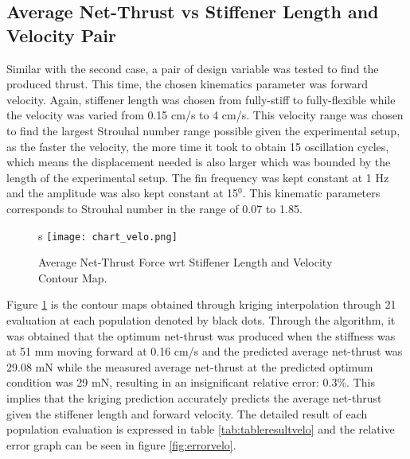 \subsection{Average Net-Thrust vs Stiffener Length and Velocity Pair}
Similar with the second case, a pair of design variable was tested to find the produced thrust. This time, the chosen kinematics parameter was forward velocity. Again, stiffener length was chosen from fully-stiff to fully-flexible while the velocity was varied from 0.15 cm/s to 4 cm/s. This velocity range was chosen to find the largest Strouhal number range possible given the experimental setup, as the faster the velocity, the more time it took to obtain 15 oscillation cycles, which means the displacement needed is also larger which was bounded by the length of the experimental setup. The fin frequency was kept constant at 1 Hz and the amplitude was also kept constant at 15$^{0}$. This kinematic parameters corresponds to Strouhal number in the range of 0.07 to 1.85.\par
\begin{figure}[H]s
    \centering
    \texttt{[image: chart\_velo.png]}
    \caption{Average Net-Thrust Force wrt Stiffener Length and Velocity Contour Map.}
    \label{fig:chart_velo}
\end{figure}
Figure \ref{fig:chart_velo} is the contour maps obtained through kriging interpolation through 21 evaluation at each population denoted by black dots. Through the algorithm, it was obtained that the optimum net-thrust was produced when the stiffness was at 51 mm moving forward at 0.16 cm/s and the predicted average net-thrust was 29.08 mN while the measured average net-thrust at the predicted optimum condition was 29 mN, resulting in an insignificant relative error: 0.3\%. This implies that the kriging prediction accurately predicts the average net-thrust given the stiffener length and forward velocity. The detailed result of each population evaluation is expressed in table \ref{tab:tableresultvelo} and the relative error graph can be seen in figure \ref{fig:errorvelo}.

